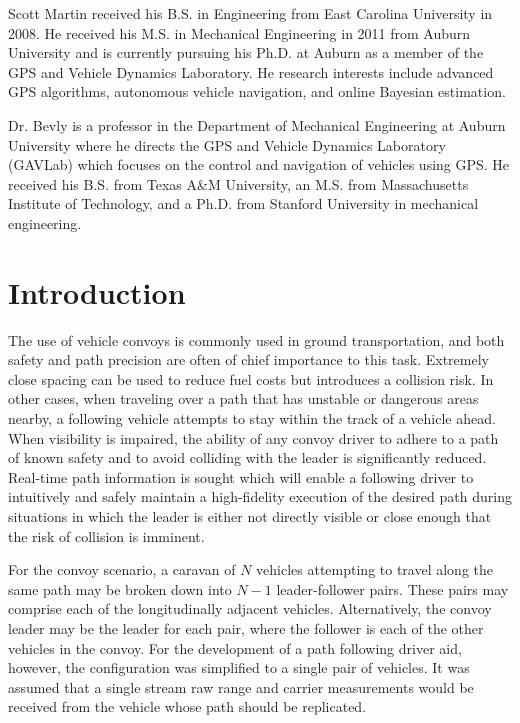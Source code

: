 \documentclass[twocolumn,10pt]{article}
\begin{document}
  Scott Martin received his B.S. in Engineering from East Carolina University in 2008. He received his M.S. in Mechanical Engineering in 2011 from Auburn University and is currently pursuing his Ph.D. at Auburn as a member of the GPS and Vehicle Dynamics Laboratory. He research interests include advanced GPS algorithms, autonomous vehicle navigation, and online Bayesian estimation. 

  Dr. Bevly is a professor in the Department of Mechanical Engineering at Auburn University where he directs the GPS and Vehicle Dynamics Laboratory (GAVLab) which focuses on the control and navigation of vehicles using GPS.  He received his B.S. from Texas A&M University, an M.S. from Massachusetts Institute of Technology, and a Ph.D. from Stanford University in mechanical engineering. 


\section*{Introduction}

  The use of vehicle convoys is commonly used in ground transportation, and both safety and path precision are often of chief importance to this task.  Extremely close spacing can be used to reduce fuel costs but introduces a collision risk.  In other cases, when traveling over a path that has unstable or dangerous areas nearby, a following vehicle attempts to stay within the track of a vehicle ahead.  When visibility is impaired, the ability of any convoy driver to adhere to a path of known safety and to avoid colliding with the leader is significantly reduced.  Real-time path information is sought which will enable a following driver to intuitively and safely maintain a high-fidelity execution of the desired path during situations in which the leader is either not directly visible or close enough that the risk of collision is imminent.

  For the convoy scenario, a caravan of $N$ vehicles attempting to travel along the same path may be broken down into $N-1$ leader-follower pairs.  These pairs may comprise each of the longitudinally adjacent vehicles.  Alternatively, the convoy leader may be the leader for each pair, where the follower is each of the other vehicles in the convoy.  For the development of a path following driver aid, however, the configuration was simplified to a single pair of vehicles.  It was assumed that a single stream raw range and carrier measurements would be received from the vehicle whose path should be replicated.
\end{document}
